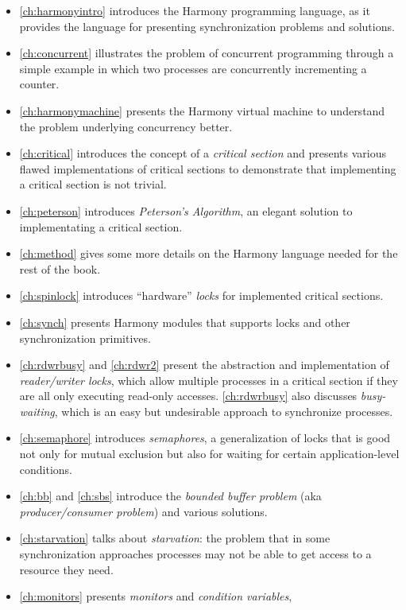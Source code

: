 \documentclass{report}
\begin{document}
\begin{itemize}
\item \autoref{ch:harmonyintro} introduces the Harmony programming
language, as it provides the language for presenting synchronization
problems and solutions.
\item \autoref{ch:concurrent} illustrates the problem of
concurrent programming through a simple example in which two processes
are concurrently incrementing a counter.
\item \autoref{ch:harmonymachine} presents the
Harmony virtual machine to understand the problem
underlying concurrency better.
\item \autoref{ch:critical} introduces the concept of a
\emph{critical section} and presents various flawed implementations
of critical sections to demonstrate that implementing a critical section
is not trivial.
\item \autoref{ch:peterson} introduces \emph{Peterson's Algorithm}, an
elegant solution to implementating a critical section.
\item \autoref{ch:method} gives some more details on the Harmony
language needed for the rest of the book.
\item \autoref{ch:spinlock} introduces ``hardware'' \emph{locks}
for implemented critical sections.
\item \autoref{ch:synch} presents Harmony modules
that supports locks and other synchronization primitives.
\item \autoref{ch:rdwrbusy} and \autoref{ch:rdwr2} present the
abstraction and implementation of \emph{reader/writer locks},
which allow multiple processes in a critical section if they are
all only executing read-only accesses.
\autoref{ch:rdwrbusy} also discusses \emph{busy-waiting}, which is
an easy but undesirable approach to synchronize processes.
\item \autoref{ch:semaphore} introduces \emph{semaphores},
a generalization of locks
that is good not only for mutual exclusion but also for waiting for
certain application-level conditions.
\item \autoref{ch:bb} and \autoref{ch:sbs} introduce the
\emph{bounded buffer problem} (aka \emph{producer/consumer problem})
and various solutions.
\item \autoref{ch:starvation} talks about \emph{starvation}:
the problem that in some
synchronization approaches processes may not be able to get access to a
resource they need.
\item \autoref{ch:monitors} presents
\emph{monitors} and \emph{condition variables},

\end{itemize}
\end{document}
